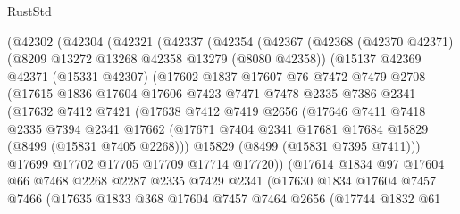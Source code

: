 \begin{lexlean}{RustStd}
\begin{coremodule}
    (@42302
      (@42304
        (@42321
          (@42337
            (@42354
              (@42367
                (@42368
                  (@42370 @42371)
                  (@8209 @13272 @13268 @42358 @13279 (@8080 @42358))
                  (@15137
                    @42369
                    @42371
                    (@15331 @42307)
                    (@17602
                      @1837
                      @17607
                      @76
                      @7472
                      @7479
                      @2708
                      (@17615
                        @1836
                        @17604
                        @17606
                        @7423
                        @7471
                        @7478
                        @2335
                        @7386
                        @2341
                        (@17632
                          @7412
                          @7421
                          (@17638
                            @7412
                            @7419
                            @2656
                            (@17646
                              @7411
                              @7418
                              @2335
                              @7394
                              @2341
                              @17662
                              (@17671 @7404 @2341 @17681 @17684 @15829 (@8499 (@15831 @7405 @2268)))
                              @15829
                              (@8499 (@15831 @7395 @7411)))
                            @17699
                            @17702
                            @17705
                            @17709
                            @17714
                            @17720))
                        (@17614
                          @1834
                          @97
                          @17604
                          @66
                          @7468
                          @2268
                          @2287
                          @2335
                          @7429
                          @2341
                          (@17630
                            @1834
                            @17604
                            @7457
                            @7466
                            (@17635
                              @1833
                              @368
                              @17604
                              @7457
                              @7464
                              @2656
                              (@17744
                                @1832
                                @61

\end{coremodule}
\end{lexlean}
